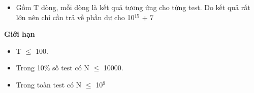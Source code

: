 \begin{itemize}
	\item Gồm T dòng, mỗi dòng là kết quả tương ứng cho từng test. Do kết quả rất lớn nên chỉ cần trả về phần dư cho 10$^15 $ + 7
\end{itemize}

\textbf{Giới hạn }
\begin{itemize}
	\item T  $\le$  100.
	\item Trong 10\% số test có N  $\le$  10000.
	\item Trong toàn test có N  $\le$  10$^9 $
\end{itemize}

\